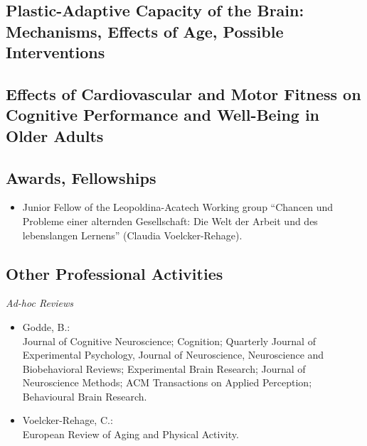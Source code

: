 \subsection{Plastic-Adaptive Capacity of the Brain: Mechanisms, Effects of Age, Possible Interventions}



\subsection{Effects of Cardiovascular and Motor Fitness on Cognitive Performance and Well-Being in Older Adults}



\subsection{Awards, Fellowships}

\begin{itemize}
\item Junior Fellow of the Leopoldina-Acatech Working group ``Chancen und Probleme einer alternden Gesellschaft: Die Welt der Arbeit und des lebenslangen Lernens'' (Claudia Voelcker-Rehage).
\end{itemize}
 
\subsection{Other Professional Activities}

\textit{Ad-hoc Reviews}

\begin{itemize}
\item Godde, B.: \\Journal of Cognitive Neuroscience; Cognition; Quarterly Journal of Experimental Psychology, Journal of Neuroscience, Neuroscience and Biobehavioral Reviews; Experimental Brain Research; Journal of Neuroscience Methods; ACM Transactions on Applied Perception; Behavioural Brain Research.
\item Voelcker-Rehage, C.: \\European Review of Aging and Physical Activity.
\end{itemize}

